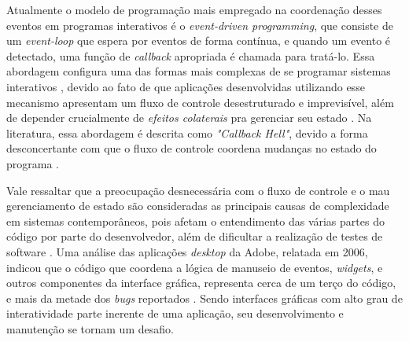Atualmente o modelo de programação mais empregado na coordenação desses eventos
em programas interativos é o \textit{event-driven programming}\footnotemark,
que consiste de um \textit{event-loop} que espera por eventos de forma contínua,
e quando um evento é detectado, uma função de
\textit{callback} apropriada é chamada para tratá-lo.
Essa abordagem configura uma das formas mais complexas de se programar sistemas interativos
\cite{edwards2009coherent,maier2010deprecating,reppy1992higher}, devido ao fato de que
aplicações desenvolvidas utilizando esse mecanismo apresentam um fluxo de controle
desestruturado e imprevisível, além de depender crucialmente de \textit{efeitos colaterais\footnotemark} pra
gerenciar seu estado \cite{meyerovich2009flapjax,muller2015interactive,muller2015practical}.
Na literatura, essa abordagem é descrita como \textit{"Callback Hell"}, devido %
a forma desconcertante com que o fluxo de controle coordena mudanças no estado
do programa \cite[p.~2]{edwards2009coherent}. %

Vale ressaltar que a preocupação desnecessária com o fluxo de controle e o mau
gerenciamento de estado são consideradas as principais causas de complexidade em
sistemas contemporâneos, pois afetam o entendimento das várias partes do código
por parte do desenvolvedor, além de dificultar a realização de testes de software
\cite{Moseley06outof}.
Uma análise das aplicações \textit{desktop} da Adobe, relatada em 2006, indicou
que o código que coordena a lógica de manuseio de eventos, \textit{widgets},
e outros componentes da interface gráfica, representa cerca de um terço do código, e
mais da metade dos \textit{bugs} reportados \cite{jarvi2008property}.
Sendo interfaces gráficas com alto grau de interatividade parte inerente
de uma aplicação, seu desenvolvimento e manutenção se tornam um desafio.

